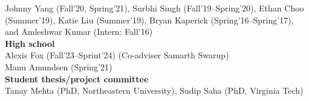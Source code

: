 \documentclass[margin,10pt]{res}
\begin{document}
\begin{resume}
Johnny Yang (Fall'20, Spring'21),
Surbhi Singh (Fall'19--Spring'20),
Ethan Choo (Summer'19),
Katie Liu (Summer'19),
Bryan Kaperick (Spring'16--Spring'17), and
Amleshwar Kumar (Intern: Fall'16) \vspace{.2cm}\\
\noindent\textbf{High school}\\
Alexis Fox (Fall'23--Sprint'24) (Co-adviser Samarth Swarup) \\
Manu Amundsen (Spring'21)\vspace{.2cm}\\
\noindent\textbf{Student thesis/project committee}\\
Tanay Mehta (PhD, Northeastern University),
Sudip Saha (PhD, Virginia Tech)

\end{resume}
\end{document}
